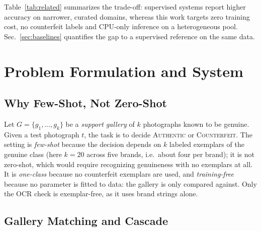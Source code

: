 \documentclass[conference]{IEEEtran}
\begin{document}
Table~\ref{tab:related} summarizes the trade-off: supervised systems
report higher accuracy on narrower, curated domains, whereas this work
targets zero training cost, no counterfeit labels and CPU-only inference
on a heterogeneous pool. Sec.~\ref{sec:baselines} quantifies the gap to a
supervised reference on the same data.

\section{Problem Formulation and System}
\label{sec:problem}

\subsection{Why Few-Shot, Not Zero-Shot}

Let $G = \{g_1,\dots,g_k\}$ be a \emph{support gallery} of $k$
photographs known to be genuine. Given a test photograph $t$, the task is
to decide \textsc{Authentic} or \textsc{Counterfeit}. The setting is
\emph{few-shot} because the decision depends on $k$ labeled exemplars of
the genuine class (here $k{=}20$ across five brands, i.e.\ about four per
brand); it is not zero-shot, which would require recognizing genuineness
with no exemplars at all. It is \emph{one-class} because no counterfeit
exemplars are used, and \emph{training-free} because no parameter is
fitted to data: the gallery is only compared against. Only the OCR check
is exemplar-free, as it uses brand strings alone.

\subsection{Gallery Matching and Cascade}
\end{document}
